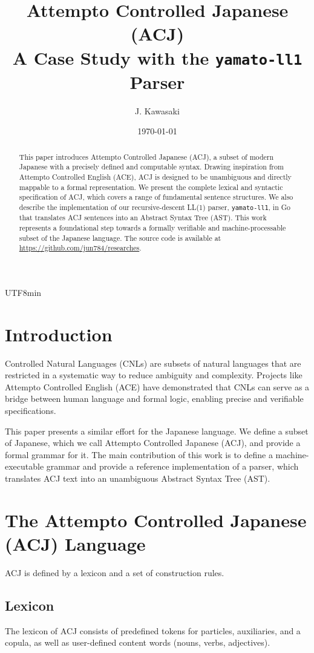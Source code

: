 \documentclass{article}
\title{Attempto Controlled Japanese (ACJ) \\ \large A Case Study with the \texttt{yamato-ll1} Parser}
\author{J. Kawasaki}
\date{\today}
\begin{document}
\begin{CJK}{UTF8}{min}

\maketitle

\begin{abstract}
This paper introduces Attempto Controlled Japanese (ACJ), a subset of modern Japanese with a precisely defined and computable syntax. Drawing inspiration from Attempto Controlled English (ACE), ACJ is designed to be unambiguous and directly mappable to a formal representation. We present the complete lexical and syntactic specification of ACJ, which covers a range of fundamental sentence structures. We also describe the implementation of our recursive-descent LL(1) parser, \texttt{yamato-ll1}, in Go that translates ACJ sentences into an Abstract Syntax Tree (AST). This work represents a foundational step towards a formally verifiable and machine-processable subset of the Japanese language. The source code is available at \url{https://github.com/jun784/researches}.
\end{abstract}

\section{Introduction}
Controlled Natural Languages (CNLs) are subsets of natural languages that are restricted in a systematic way to reduce ambiguity and complexity. Projects like Attempto Controlled English (ACE) have demonstrated that CNLs can serve as a bridge between human language and formal logic, enabling precise and verifiable specifications.

This paper presents a similar effort for the Japanese language. We define a subset of Japanese, which we call Attempto Controlled Japanese (ACJ), and provide a formal grammar for it. The main contribution of this work is to define a machine-executable grammar and provide a reference implementation of a parser, which translates ACJ text into an unambiguous Abstract Syntax Tree (AST).

\section{The Attempto Controlled Japanese (ACJ) Language}
ACJ is defined by a lexicon and a set of construction rules.

\subsection{Lexicon}
The lexicon of ACJ consists of predefined tokens for particles, auxiliaries, and a copula, as well as user-defined content words (nouns, verbs, adjectives).


\end{CJK}
\end{document}

